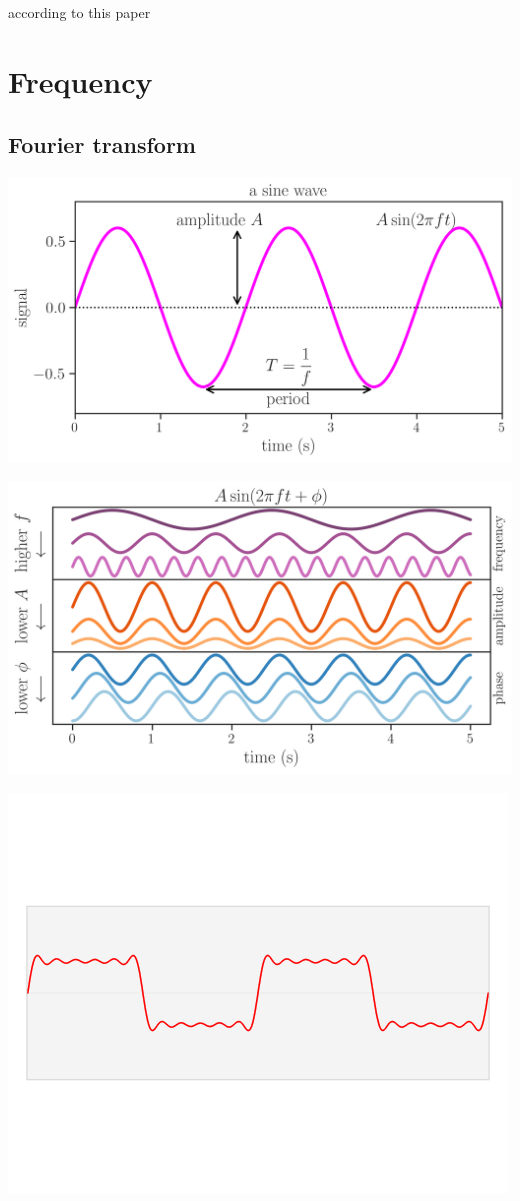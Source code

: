 \documentclass[
  letterpaper,
  DIV=11,
  numbers=noendperiod,
  oneside]{scrreprt}
\begin{document}
according to this paper

\part{Frequency}

\hypertarget{fourier-transform}{%
\chapter{Fourier transform}\label{fourier-transform}}

\includegraphics{frequency/sine1.png}

\includegraphics{frequency/sine2.png}

\includegraphics{frequency/Fourier_transform_time_and_frequency_domains.gif}
\end{document}
